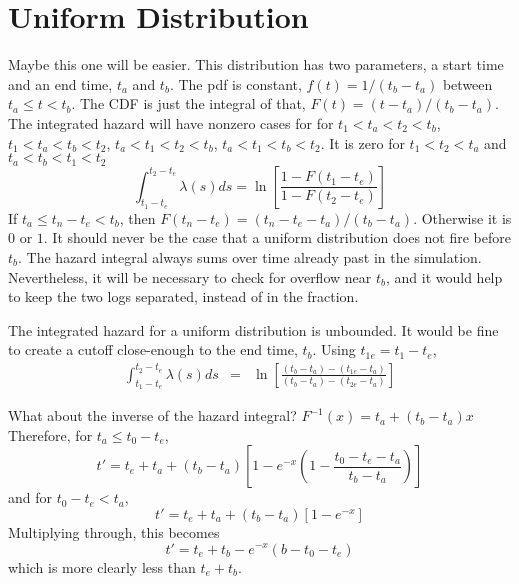 \documentclass{article}
\begin{document}

\section{Uniform Distribution}
Maybe this one will be easier.
This distribution has two parameters, a start time
and an end time, $t_a$ and $t_b$.
The pdf is constant, $f(t)=1/(t_b-t_a)$ between
$t_a\le t<t_b$. The CDF is just the integral of
that, $F(t)=(t-t_a)/(t_b-t_a)$.
The integrated hazard will have nonzero cases for
for $t_1<t_a<t_2<t_b$, $t_1<t_a<t_b<t_2$,
$t_a<t_1<t_2<t_b$, $t_a<t_1<t_b<t_2$.
It is zero for $t_1<t_2<t_a$ and $t_a<t_b<t_1<t_2$
\begin{equation}
  \int_{t_1-t_e}^{t_2-t_e}\lambda(s)ds=
      \ln\left[\frac{1-F(t_1-t_e)}{1-F(t_2-t_e)}\right]
\end{equation}
If $t_a\le t_n-t_e<t_b$, then $F(t_n-t_e)=(t_n-t_e-t_a)/(t_b-t_a)$.
Otherwise it is $0$ or $1$. It should never be the
case that a uniform distribution does not fire
before $t_b$. The hazard integral always sums over
time already past in the simulation. Nevertheless, it will
be necessary to check for overflow near $t_b$, and it
would help to keep the two logs separated, instead of
in the fraction.

The integrated hazard for a uniform distribution is unbounded.
It would be fine to create a cutoff close-enough to the
end time, $t_b$. Using $t_{1e}=t_1-t_e$,
\begin{eqnarray}
  \int_{t_1-t_e}^{t_2-t_e}\lambda(s)ds&=&\ln\left[
    \frac{(t_b-t_a)-(t_{1e}-t_a)}{(t_b-t_a)-(t_{2e}-t_a)}\right]
\end{eqnarray}


What about the inverse of the hazard integral?
$F^{-1}(x)=t_a+(t_b-t_a)x$ Therefore, for $t_a\le t_0-t_e$,
\begin{equation}
  t'=t_e+t_a+(t_b-t_a)\left[1-e^{-x}\left(1-\frac{t_0-t_e-t_a}{t_b-t_a}\right)\right]
\end{equation}
and for $t_0-t_e< t_a$,
\begin{equation}
  t'=t_e+t_a+(t_b-t_a)\left[1-e^{-x}\right]
\end{equation}
Multiplying through, this becomes
\begin{equation}
  t'=t_e+t_b-e^{-x}(b-t_0-t_e)
\end{equation}
which is more clearly less than $t_e+t_b$.







\end{document}
